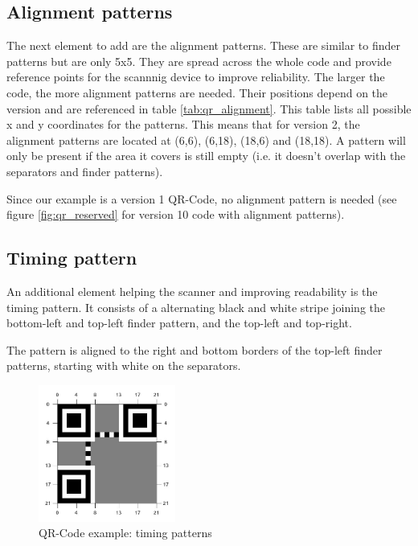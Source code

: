 \subsection{Alignment patterns}
\label{ssec:qr_alignment}

The next element to add are the alignment patterns. These are similar to finder patterns but are only 5x5. They are spread across the whole code and provide reference points for the scannnig device to improve reliability. The larger the code, the more alignment patterns are needed. Their positions depend on the version and are referenced in table \ref{tab:qr_alignment}. This table lists all possible x and y coordinates for the patterns. This means that for version 2, the alignment patterns are located at (6,6), (6,18), (18,6) and (18,18). A pattern will only be present if the area it covers is still empty (i.e. it doesn't overlap with the separators and finder patterns).

Since our example is a version 1 QR-Code, no alignment pattern is needed (see figure \ref{fig:qr_reserved} for version 10 code with alignment patterns).

\subsection{Timing pattern}
\label{ssec:qr_timing}

An additional element helping the scanner and improving readability is the timing pattern. It consists of a alternating black and white stripe joining the bottom-left and top-left finder pattern, and the top-left and top-right.

The pattern is aligned to the right and bottom borders of the top-left finder patterns, starting with white on the separators.

\begin{figure}[H]
  \centering
  \includegraphics[width=0.4\textwidth]{images/qr_timing}
  \caption{QR-Code example: timing patterns}
  \label{fig:qr_timing}
\end{figure}

